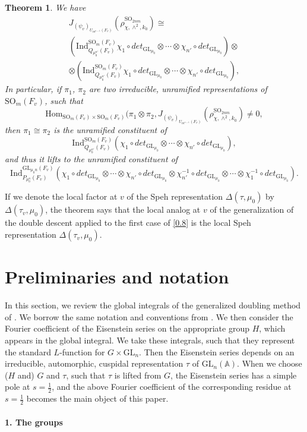 \documentclass[12pts]{amsart}
\newcommand{\BA}{{\mathbb {A}}}
\newcommand{\GL}{{\mathrm{GL}}}
\newcommand{\Hom}{{\mathrm{Hom}}}
\newcommand{\Ind}{{\mathrm{Ind}}}
\newcommand{\SO}{{\mathrm{SO}}}
\newtheorem{thm}{Theorem}[section]
\begin{document}
	\begin{thm}\label{thm 0.5}
		We have
\begin{multline}\nonumber
J_{(\psi_v)_{U_{m^{n-1}}(F_v)}}(\rho^{\SO_{2nm}}_{\chi,\wedge^2,k_0})\cong\\ (\Ind_{Q_{\mu_0^{n'}}(F_v)}^{\SO_m(F_v)}\chi_1\circ det_{\GL_{\mu_0}}\otimes\cdots\otimes\chi_{n'}\circ det_{\GL_{\mu_0}})\otimes\\ \otimes(\Ind_{Q_{\mu_0^{n'}}(F_v)}^{\SO_m(F_v)}\chi_1\circ det_{\GL_{\mu_0}}\otimes\cdots\otimes\chi_{n'}\circ det_{\GL_{\mu_0}}),
\end{multline}
In particular, if $\pi_1$, $\pi_2$ are two irreducible, unramified representations of $\SO_m(F_v)$, such that
$$
\Hom_{\SO_m(F_v)\times \SO_m(F_v)}(\pi_1\otimes \pi_2,
J_{(\psi_v)_{U_{m^{n-1}}(F_v)}}(\rho^{\SO_{2nm}}_{\chi,\wedge^2,k_0})\neq 0,
$$
then $\pi_1\cong \pi_2$ is the unramified constituent of 
$$
\Ind_{Q_{\mu_0^{n'}}(F_v)}^{\SO_m(F_v)}(\chi_1\circ det_{\GL_{\mu_0}}\otimes\cdots\otimes\chi_{n'}\circ det_{\GL_{\mu_0}}),
$$
and thus it lifts to the unramified constituent of
$$
\Ind_{P_{\mu_0^n}(F_v)}^{\GL_{\mu_0n}(F_v)}(\chi_1\circ det_{\GL_{\mu_0}}\otimes\cdots\otimes\chi_{n'}\circ det_{\GL_{\mu_0}}\otimes
\chi^{-1}_{n'}\circ det_{\GL_{\mu_0}}\otimes\cdots\otimes \chi^{-1}_1\circ det_{\GL_{\mu_0}}). 
$$
\end{thm}

If we denote the local factor at $v$ of the Speh representation $\Delta(\tau,\mu_0)$ by $\Delta(\tau_v,\mu_0)$, the theorem says that the local analog at $v$ of the generalization of the double descent applied to the first case of \eqref{0.8} is the local Speh representation $\Delta(\tau_v,\mu_0)$. 







		
\section{Preliminaries and notation}

In this section, we review the global integrals of the generalized doubling method of \cite{CFGK17}. We borrow the same notation and conventions from \cite{GS18}. We then consider the Fourier coefficient of the Eisenstein series on the appropriate group $H$, which appears in the global integral. We take these integrals, such that they represent the standard $L$-function for $G\times \GL_n$. Then the Eisenstein series depends on an irreducible, automorphic, cuspidal representation $\tau$ of $\GL_n(\BA)$. When we choose ($H$ and) $G$ and $\tau$, such that $\tau$ is lifted from $G$, the Eisenstein series has a simple pole at $s=\frac{1}{2}$, and the above Fourier coefficient of the corresponding residue at $s=\frac{1}{2}$ becomes the main object of this paper. \\
\\
{\bf 1. The groups}\\
\end{document}
